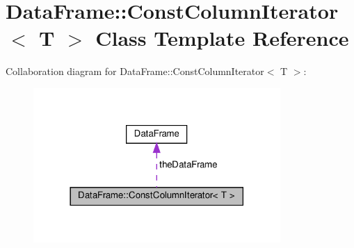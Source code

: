 \hypertarget{classDataFrame_1_1ConstColumnIterator}{}\section{Data\+Frame\+:\+:Const\+Column\+Iterator$<$ T $>$ Class Template Reference}
\label{classDataFrame_1_1ConstColumnIterator}


Collaboration diagram for Data\+Frame\+:\+:Const\+Column\+Iterator$<$ T $>$\+:\nopagebreak
\begin{figure}[H]
\begin{center}
\leavevmode
\includegraphics[width=266pt]{classDataFrame_1_1ConstColumnIterator__coll__graph}
\end{center}
\end{figure}
